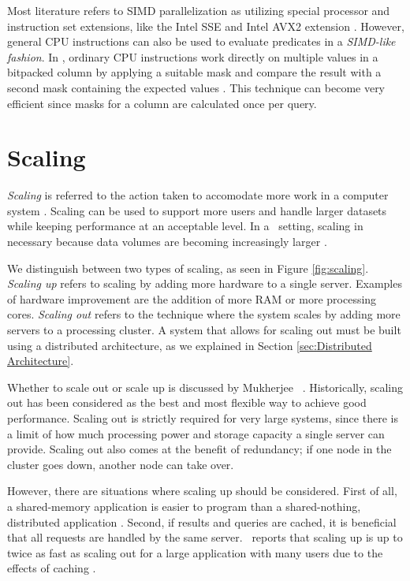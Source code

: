 Most literature refers to SIMD parallelization as utilizing special processor and instruction set extensions, like the Intel SSE and Intel AVX2 extension \cite{Willhalm2013-ri, Willhalm2009-hu}. However, general CPU instructions can also be used to evaluate predicates in a \textit{SIMD-like fashion}. In \blink, ordinary CPU instructions work directly on multiple values in a bitpacked column by applying a suitable mask and compare the result with a second mask containing the expected values \cite{Johnson2008-cp}. This technique can become very efficient since masks for a column are calculated once per query.

\section{Scaling}
\label{sec:Scaling}
\textit{Scaling} is referred to the action taken to accomodate more work in a computer system \cite{Wikipedia_contributors2015-lw}. Scaling can be used to support more users and handle larger datasets while keeping performance at an acceptable level. In a \bd~setting, scaling in necessary because data volumes are becoming increasingly larger \cite{Qlik2012-ku}.


We distinguish between two types of scaling, as seen in Figure \ref{fig:scaling}. \textit{Scaling up} refers to scaling by adding more hardware to a single server. Examples of hardware improvement are the addition of more RAM or more processing cores. \textit{Scaling out} refers to the technique where the system scales by adding more servers to a processing cluster. A system that allows for scaling out must be built using a distributed architecture, as we explained in Section \ref{sec:Distributed Architecture}.

Whether to scale out or scale up is discussed by Mukherjee \ea~\cite{Mukherjee2015-ul}. Historically, scaling out has been considered as the best and most flexible way to achieve good performance. Scaling out is strictly required for very large systems, since there is a limit of how much processing power and storage capacity a single server can provide. Scaling out also comes at the benefit of redundancy; if one node in the cluster goes down, another node can take over.

However, there are situations where scaling up should be considered. First of all, a shared-memory application is easier to program than a shared-nothing, distributed application \cite{Boncz2002-yj}. Second, if results and queries are cached, it is beneficial that all requests are handled by the same server. \qlikview~reports that scaling up is up to twice as fast as scaling out for a large application with many users due to the effects of caching \cite{Qlik2012-ku}.

